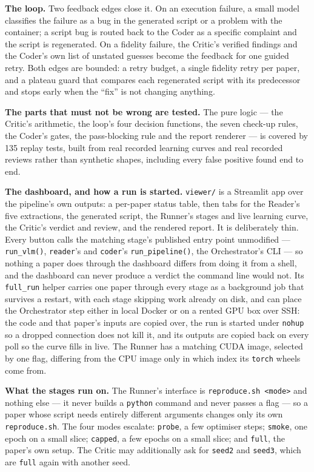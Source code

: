 \documentclass[11pt]{article}
\begin{document}
\textbf{The loop.} Two feedback edges close it. On an execution failure, a small model classifies
the failure as a bug in the generated script or a problem with the container; a script bug is
routed back to the Coder as a specific complaint and the script is regenerated. On a fidelity
failure, the Critic's verified findings and the Coder's own list of unstated guesses become the
feedback for one guided retry. Both edges are bounded: a retry budget, a single fidelity retry
per paper, and a plateau guard that compares each regenerated script with its predecessor and
stops early when the ``fix'' is not changing anything.

\textbf{The parts that must not be wrong are tested.} The pure logic --- the Critic's arithmetic,
the loop's four decision functions, the seven check-up rules, the Coder's gates, the
pass-blocking rule and the report renderer --- is covered by 135 replay tests, built from real
recorded learning curves and real recorded reviews rather than synthetic shapes, including every
false positive found end to end.

\textbf{The dashboard, and how a run is started.} \texttt{viewer/} is a Streamlit app over the
pipeline's own outputs: a per-paper status table, then tabs for the Reader's five extractions,
the generated script, the Runner's stages and live learning curve, the Critic's verdict and
review, and the rendered report. It is deliberately thin. Every button calls the matching
stage's published entry point unmodified --- \texttt{run\_vlm()}, \texttt{reader}'s and
\texttt{coder}'s \texttt{run\_pipeline()}, the Orchestrator's CLI --- so nothing a paper does
through the dashboard differs from doing it from a shell, and the dashboard can never produce a
verdict the command line would not. Its \texttt{full\_run} helper carries one paper through
every stage as a background job that survives a restart, with each stage skipping work already
on disk, and can place the Orchestrator step either in local Docker or on a rented GPU box over
SSH: the code and that paper's inputs are copied over, the run is started under
\texttt{nohup} so a dropped connection does not kill it, and its outputs are copied back on
every poll so the curve fills in live. The Runner has a matching CUDA image, selected by one
flag, differing from the CPU image only in which index its \texttt{torch} wheels come from.

\textbf{What the stages run on.} The Runner's interface is \texttt{reproduce.sh <mode>} and
nothing else --- it never builds a \texttt{python} command and never passes a flag --- so a paper
whose script needs entirely different arguments changes only its own \texttt{reproduce.sh}. The
four modes escalate: \texttt{probe}, a few optimiser steps; \texttt{smoke}, one epoch on a small
slice; \texttt{capped}, a few epochs on a small slice; and \texttt{full}, the paper's own setup.
The Critic may additionally ask for \texttt{seed2} and \texttt{seed3}, which are \texttt{full}
again with another seed.
\end{document}
